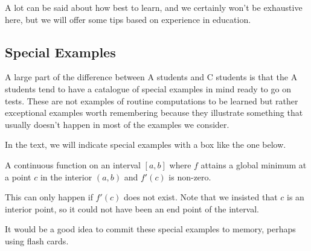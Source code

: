 \documentclass[11pt]{book}
\numberwithin{example}{chapter}
\begin{document}
A lot can be said about how best to learn, and we certainly won't be exhaustive here, but we will offer some tips based on experience in education.  


\subsection*{Special Examples}

A large part of the difference between A students and C students is that the A students tend to have a catalogue of special examples in mind ready to go on tests.  These are not examples of routine computations to be learned but rather exceptional examples worth remembering because they illustrate something that usually doesn't happen in most of the examples we consider.  

In the text, we will indicate special examples with a box like the one below.    

\begin{specialexample}
A continuous function on an interval $[a,b]$ where $f$ attains a global minimum at a point $c$ in the interior $(a,b)$ and $f'(c)$ is non-zero.


\begin{center}
\end{center}

This can only happen if $f'(c)$ does not exist.  Note that we insisted that $c$ is an interior point, so it could not have been an end point of the interval.

\end{specialexample}


It would be a good idea to commit these special examples to memory, perhaps using flash cards.  

 
\end{document}
